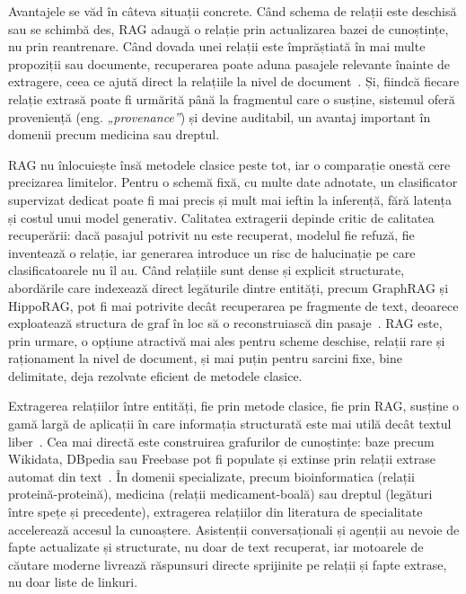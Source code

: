 Avantajele se văd în câteva situații concrete. Când schema de relații este deschisă sau se schimbă des, RAG adaugă o relație prin actualizarea bazei de cunoștințe, nu prin reantrenare. Când dovada unei relații este împrăștiată în mai multe propoziții sau documente, recuperarea poate aduna pasajele relevante înainte de extragere, ceea ce ajută direct la relațiile la nivel de document~\cite{yao2019docred}. Și, fiindcă fiecare relație extrasă poate fi urmărită până la fragmentul care o susține, sistemul oferă proveniență (eng. \textit{„provenance”}) și devine auditabil, un avantaj important în domenii precum medicina sau dreptul.

RAG nu înlocuiește însă metodele clasice peste tot, iar o comparație onestă cere precizarea limitelor. Pentru o schemă fixă, cu multe date adnotate, un clasificator supervizat dedicat poate fi mai precis și mult mai ieftin la inferență, fără latența și costul unui model generativ. Calitatea extragerii depinde critic de calitatea recuperării: dacă pasajul potrivit nu este recuperat, modelul fie refuză, fie inventează o relație, iar generarea introduce un risc de halucinație pe care clasificatoarele nu îl au. Când relațiile sunt dense și explicit structurate, abordările care indexează direct legăturile dintre entități, precum GraphRAG și HippoRAG, pot fi mai potrivite decât recuperarea pe fragmente de text, deoarece exploatează structura de graf în loc să o reconstruiască din pasaje~\cite{edge2024graphrag, gutierrez2024hipporag}. RAG este, prin urmare, o opțiune atractivă mai ales pentru scheme deschise, relații rare și raționament la nivel de document, și mai puțin pentru sarcini fixe, bine delimitate, deja rezolvate eficient de metodele clasice.

Extragerea relațiilor între entități, fie prin metode clasice, fie prin RAG, susține o gamă largă de aplicații în care informația structurată este mai utilă decât textul liber~\cite{gao2024retrievalaugmentedgenerationlargelanguage}. Cea mai directă este construirea grafurilor de cunoștințe: baze precum Wikidata, DBpedia sau Freebase pot fi populate și extinse prin relații extrase automat din text~\cite{elsahar2018trex}. În domenii specializate, precum bioinformatica (relații proteină-proteină), medicina (relații medicament-boală) sau dreptul (legături între spețe și precedente), extragerea relațiilor din literatura de specialitate accelerează accesul la cunoaștere. Asistenții conversaționali și agenții au nevoie de fapte actualizate și structurate, nu doar de text recuperat, iar motoarele de căutare moderne livrează răspunsuri directe sprijinite pe relații și fapte extrase, nu doar liste de linkuri.

